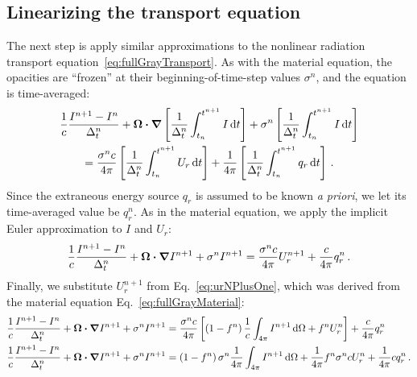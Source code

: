\subsection{Linearizing the transport equation}
The next step is apply similar approximations to the nonlinear radiation
transport equation~\eqref{eq:fullGrayTransport}. As with the material equation,
the
opacities are ``frozen'' at their beginning-of-time-step values $\sigma^n$, and
the equation is time-averaged:
\begin{multline*}
  \frac{1}{c} \frac{I^{n+1} - I^n}{\Delta_t^n}
  + \bm{\Omega} \bm{\cdot} \bm{\nabla} \left[
  \frac{1}{\Delta_t^n}\int_{t_n}^{t^{n+1}} I\mathop{}\!\mathrm{d} t
  \right] +
 \sigma^n \left[
  \frac{1}{\Delta_t^n}\int_{t_n}^{t^{n+1}} I\mathop{}\!\mathrm{d} t
  \right]
  \\
  = \frac{\sigma^n c}{4\pi} \left[
  \frac{1}{\Delta_t^n}\int_{t_n}^{t^{n+1}} U_r \mathop{}\!\mathrm{d} t \right]
  + \frac{1}{4\pi}\left[
  \frac{1}{\Delta_t^n}\int_{t_n}^{t^{n+1}} q_r \mathop{}\!\mathrm{d} t \right] \,.
\end{multline*}
Since the extraneous energy source $q_r$ is assumed to be known \emph{a priori},
we let its time-averaged value be $q_r^n$. As in the material equation, we apply
the implicit Euler approximation to $I$ and $U_r$:
\begin{equation*}
  \frac{1}{c} \frac{I^{n+1} - I^n}{\Delta_t^n}
  + \bm{\Omega} \bm{\cdot} \bm{\nabla} I^{n+1}
 + \sigma^n I^{n+1}
 = \frac{\sigma^n c}{4\pi} U_r^{n+1}
  + \frac{c}{4\pi} q_r^n \,.
\end{equation*}
Finally, we substitute $U_r^{n+1}$ from Eq.~\eqref{eq:urNPlusOne},
which was derived from the material equation Eq.~\eqref{eq:fullGrayMaterial}:
\begin{align}\nonumber
  \frac{1}{c} \frac{I^{n+1} - I^n}{\Delta_t^n}
  + \bm{\Omega} \bm{\cdot} \bm{\nabla} I^{n+1}
 + \sigma^n I^{n+1}
 &= \frac{\sigma^n c}{4\pi} \left[ \left(1 - f^n\right) \frac1c \int_{4\pi} I^{n+1}\mathop{}\!\mathrm{d} \Omega + f^n U_r^n \right]
  + \frac{c}{4\pi} q_r^n
  \\ \label{eq:linearizedGrayTransport}
  \frac{1}{c} \frac{I^{n+1} - I^n}{\Delta_t^n}
  + \bm{\Omega} \bm{\cdot} \bm{\nabla} I^{n+1}
 + \sigma^n I^{n+1}
 &=  \left(1 - f^n\right) \sigma^n \frac{1}{4\pi} \int_{4\pi} I^{n+1}\mathop{}\!\mathrm{d} \Omega
 + \frac{1}{4\pi} f^n \sigma^n c U_r^n
  + \frac{1}{4\pi} c q_r^n \,.
\end{align}

